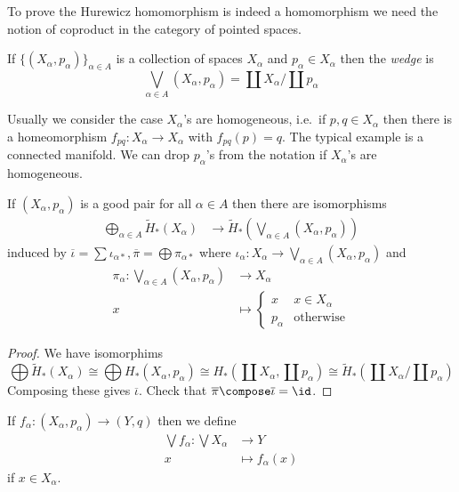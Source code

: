 \documentclass[a4paper]{article}
\begin{document}
To prove the Hurewicz homomorphism is indeed a homomorphism we need the notion of coproduct in the category of pointed spaces.
\begin{definition}[wedge]
  If \(\{(X_\alpha, p_\alpha)\}_{\alpha \in A}\) is a collection of spaces \(X_\alpha\) and \(p_\alpha \in X_\alpha\) then the \emph{wedge} is
  \[
    \bigvee_{\alpha \in A} (X_\alpha, p_\alpha) = \coprod X_\alpha / \coprod p_\alpha
  \]
\end{definition}
Usually we consider the case \(X_\alpha\)'s are homogeneous, i.e.\ if \(p, q \in X_\alpha\) then there is a homeomorphism \(f_{pq}: X_\alpha \to X_\alpha\) with \(f_{pq}(p) = q\). The typical example is a connected manifold. We can drop \(p_\alpha\)'s from the notation if \(X_\alpha\)'s are homogeneous.

\begin{lemma}
  If \((X_\alpha, p_\alpha)\) is a good pair for all \(\alpha \in A\) then there are isomorphisms
  \begin{align*}
    \bigoplus_{\alpha \in A} \widetilde H_*(X_\alpha) &\to \widetilde H_*(\bigvee_{\alpha \in A} (X_\alpha, p_\alpha))
  \end{align*}
  induced by \(\overline \iota = \sum \iota_{\alpha*}, \overline \pi = \bigoplus \pi_{\alpha*}\) where \(\iota_\alpha: X_\alpha \to \bigvee_{\alpha \in A} (X_\alpha, p_\alpha)\) and
  \begin{align*}
    \pi_\alpha: \bigvee_{\alpha \in A} (X_\alpha, p_\alpha) &\to X_\alpha \\
    x &\mapsto
        \begin{cases}
          x & x \in X_\alpha \\
          p_\alpha & \text{otherwise}
        \end{cases}
  \end{align*}
\end{lemma}

\begin{proof}
  We have isomorphims
  \[
    \bigoplus \widetilde H_*(X_\alpha) \cong \bigoplus H_*(X_\alpha, p_\alpha) \cong H_*(\coprod X_\alpha, \coprod p_\alpha) \cong \widetilde H_*(\coprod X_\alpha/\coprod p_\alpha)
  \]
  Composing these gives \(\overline \iota\). Check that \(\overline \pi \compose \overline \iota = \id\).
\end{proof}

If \(f_\alpha: (X_\alpha, p_\alpha) \to (Y, q)\) then we define
\begin{align*}
  \bigvee f_\alpha: \bigvee X_\alpha &\to Y \\
  x &\mapsto f_\alpha(x)
\end{align*}
if \(x \in X_\alpha\).
\end{document}
